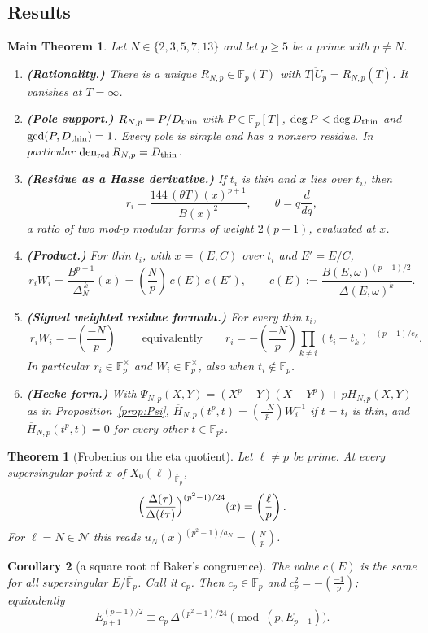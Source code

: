 \documentclass[11pt,a4paper]{article}
\numberwithin{equation}{section}
\newtheorem{theorem}{Theorem}[section]
\newtheorem{corollary}[theorem]{Corollary}
\newtheorem*{maintheorem}{Main Theorem}
\theoremstyle{definition}
\theoremstyle{remark}
\newcommand{\Fp}{\mathbb F_p}
\newcommand{\Fq}{\mathbb F_{p^2}}
\newcommand{\Fb}{\overline{\mathbb F}_p}
\newcommand{\den}{\operatorname{den}_{\mathrm{red}}}
\newcommand{\leg}[2]{\left(\frac{#1}{#2}\right)}
\newcommand{\Lp}[1]{\left(\frac{#1}{p}\right)}
\begin{document}
\subsection{Results}
\begin{maintheorem}
Let $N\in\{2,3,5,7,13\}$ and let $p\ge5$ be a prime with $p\ne N$.
\begin{enumerate}[label=\textup{(\alph*)}]
\item \textbf{(Rationality.)} There is a unique $R_{N,p}\in\Fp(T)$ with $\overline{T|U_p}=R_{N,p}(\overline T)$. It vanishes at $T=\infty$.
\item \textbf{(Pole support.)} $R_{N,p}=P/D_{\rm thin}$ with $P\in\Fp[T]$,
$\deg P<\deg D_{\rm thin}$ and $\gcd(P,D_{\rm thin})=1$. Every pole is simple and has a nonzero residue. In particular $\den R_{N,p}=D_{\rm thin}$.
\item \textbf{(Residue as a Hasse derivative.)} If $t_i$ is thin and $x$ lies over $t_i$, then
\[
r_i=\frac{144\,(\theta T)(x)^{p+1}}{B(x)^2},\qquad \theta=q\frac{d}{dq},
\]
a ratio of two mod-$p$ modular forms of weight $2(p+1)$, evaluated at $x$.
\item \textbf{(Product.)} For thin $t_i$, with $x=(E,C)$ over $t_i$ and $E'=E/C$,
\[
r_iW_i=\frac{B^{p-1}}{\Delta_N^{\,k}}(x)=\Lp{N}\,c(E)\,c(E'),\qquad
c(E):=\frac{B(E,\omega)^{(p-1)/2}}{\Delta(E,\omega)^{k}}.
\]
\item \textbf{(Signed weighted residue formula.)} For every thin $t_i$,
\[
\boxed{\;r_iW_i=-\Lp{-N}\;}\qquad\text{equivalently}\qquad
r_i=-\Lp{-N}\prod_{k\ne i}(t_i-t_k)^{-(p+1)/e_k}.
\]
In particular $r_i\in\Fp^\times$ and $W_i\in\Fp^\times$, also when $t_i\notin\Fp$.
\item \textbf{(Hecke form.)} With $\Psi_{N,p}(X,Y)=(X^p-Y)(X-Y^p)+pH_{N,p}(X,Y)$ as in
Proposition~\ref{prop:Psi}, $\overline H_{N,p}(t^p,t)=\Lp{-N}W_i^{-1}$ if $t=t_i$ is thin, and
$\overline H_{N,p}(t^p,t)=0$ for every other $t\in\Fq$.
\end{enumerate}
\end{maintheorem}

\begin{theorem}[Frobenius on the eta quotient]\label{thm:C}
Let $\ell\ne p$ be prime. At every supersingular point $x$ of $X_0(\ell)_{\Fb}$,
\[
\Bigl(\frac{\Delta(\tau)}{\Delta(\ell\tau)}\Bigr)^{(p^2-1)/24}(x)=\leg{\ell}{p}.
\]
For $\ell=N\in\mathcal N$ this reads $u_N(x)^{(p^2-1)/a_N}=\Lp{N}$.
\end{theorem}

\begin{corollary}[a square root of Baker's congruence]\label{cor:D}
The value $c(E)$ is the same for all supersingular $E/\Fb$. Call it $c_p$. Then
$c_p\in\Fp$ and $c_p^2=-\Lp{-1}$; equivalently
\[
E_{p+1}^{(p-1)/2}\equiv c_p\,\Delta^{(p^2-1)/24}\pmod{(p,E_{p-1})}.
\]
\end{corollary}
\end{document}
